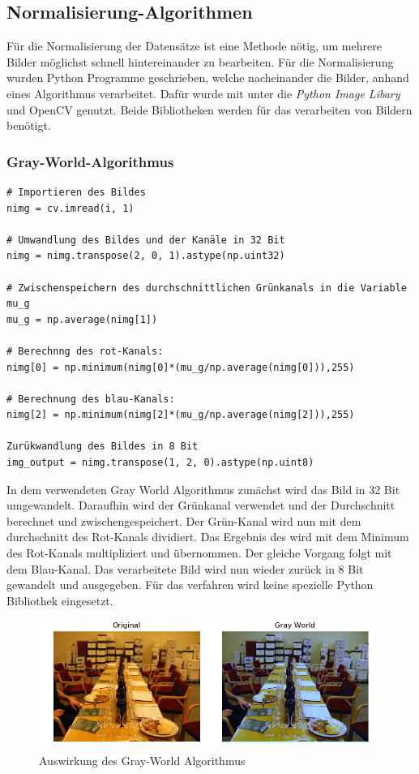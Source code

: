 \documentclass[a4paper,12pt,oneside]{article}
\begin{document}
\subsection{Normalisierung-Algorithmen}\label{s.nalgorithmen}
Für die Normalisierung der Datensätze ist eine Methode nötig, um mehrere Bilder möglichst schnell hintereinander zu bearbeiten. Für die Normalisierung wurden Python Programme geschrieben, welche nacheinander die Bilder, anhand eines Algorithmus verarbeitet. Dafür wurde mit unter die \textit{Python Image Libary} und OpenCV genutzt. Beide Bibliotheken werden für das verarbeiten von Bildern benötigt. 
\subsubsection{Gray-World-Algorithmus}
\begin{lstlisting}
# Importieren des Bildes
nimg = cv.imread(i, 1)

# Umwandlung des Bildes und der Kanäle in 32 Bit
nimg = nimg.transpose(2, 0, 1).astype(np.uint32)

# Zwischenspeichern des durchschnittlichen Grünkanals in die Variable mu_g
mu_g = np.average(nimg[1])

# Berechnng des rot-Kanals: 
nimg[0] = np.minimum(nimg[0]*(mu_g/np.average(nimg[0])),255)

# Berechnung des blau-Kanals:
nimg[2] = np.minimum(nimg[2]*(mu_g/np.average(nimg[2])),255)

Zurükwandlung des Bildes in 8 Bit
img_output = nimg.transpose(1, 2, 0).astype(np.uint8)
\end{lstlisting}
In dem verwendeten Gray World Algorithmus \cite{gray2012world} zunächst wird das Bild in 32 Bit umgewandelt. Daraufhin wird der Grünkanal verwendet und der Durchschnitt berechnet und zwischengespeichert. Der Grün-Kanal wird nun mit dem durchschnitt des Rot-Kanals dividiert. Das Ergebnis des wird mit dem Minimum des Rot-Kanals multipliziert und übernommen. Der gleiche Vorgang folgt mit dem Blau-Kanal. Das verarbeitete Bild wird nun wieder zurück in 8 Bit gewandelt und ausgegeben. Für das verfahren wird keine spezielle Python Bibliothek eingesetzt.
\begin{figure}
	[h]
	\centering
	\includegraphics[scale=0.7]{Sources/gwn.png}
	\caption{Auswirkung des Gray-World Algorithmus}
	\label{img:gwnimg}
\end{figure}
\end{document}

